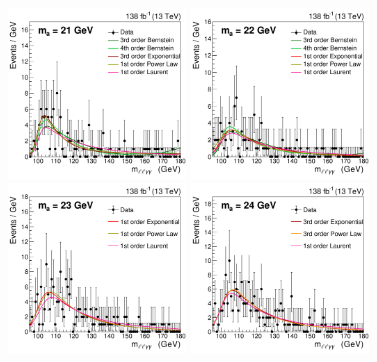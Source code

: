 \begin{figure}[htbp]
  \begin{center}
		\includegraphics[width=0.42\textwidth]{Thesis (Version 2246)/figures/chapter04/inter_mass_bkg/bkgplot_m21.pdf}
        \includegraphics[width=0.42\textwidth]{Thesis (Version 2246)/figures/chapter04/inter_mass_bkg/bkgplot_m22.pdf} \\
		\includegraphics[width=0.42\textwidth]{Thesis (Version 2246)/figures/chapter04/inter_mass_bkg/bkgplot_m23.pdf}
		\includegraphics[width=0.42\textwidth]{Thesis (Version 2246)/figures/chapter04/inter_mass_bkg/bkgplot_m24.pdf}\\
\end{center}
\end{figure}

